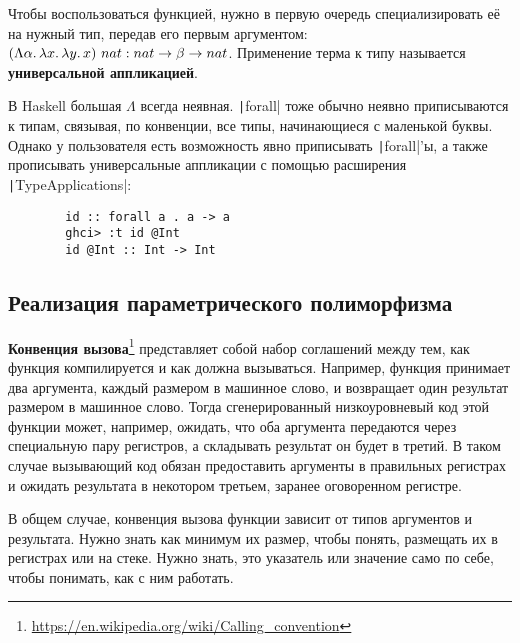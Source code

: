 \documentclass[12pt]{article}
\newcommand{\vocab}[1]{\textbf{#1}} %
\newcommand{\ap}{~}
\begin{document}
    Чтобы воспользоваться функцией, нужно в первую очередь специализировать её на нужный тип, передав его первым аргументом: $(\Lambda \alpha\ldotp\lambda x\ldotp \lambda y\ldotp x)\ap nat : nat\to\beta\to nat$.
    Применение терма к типу называется \vocab{универсальной аппликацией}.

    В Haskell большая $\Lambda$ всегда неявная.
    \texttt|forall| тоже обычно неявно приписываются к типам, связывая, по конвенции, все типы, начинающиеся с маленькой буквы.
    Однако у пользователя есть возможность явно приписывать \texttt|forall|'ы, а также прописывать универсальные аппликации с помощью расширения \texttt|TypeApplications|:
    \begin{verbatim}
        id :: forall a . a -> a
        ghci> :t id @Int
        id @Int :: Int -> Int
    \end{verbatim}


    \subsection{Реализация параметрического полиморфизма}




    \vocab{Конвенция вызова}\footnote{\url{https://en.wikipedia.org/wiki/Calling_convention}} представляет собой набор соглашений между тем, как функция компилируется и как должна вызываться.
    Например, функция принимает два аргумента, каждый размером в машинное слово, и возвращает один результат размером в машинное слово.
    Тогда сгенерированный низкоуровневый код этой функции может, например, ожидать, что оба аргумента передаются через специальную пару регистров, а складывать результат он будет в третий.
    В таком случае вызывающий код обязан предоставить аргументы в правильных регистрах и ожидать результата в некотором третьем, заранее оговоренном регистре.

    В общем случае, конвенция вызова функции зависит от типов аргументов и результата.
    Нужно знать как минимум их размер, чтобы понять, размещать их в регистрах или на стеке.
    Нужно знать, это указатель или значение само по себе, чтобы понимать, как с ним работать.
\end{document}
